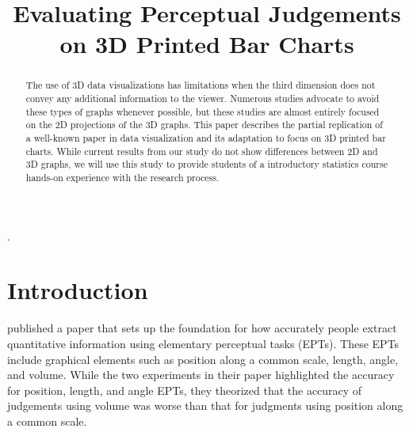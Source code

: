 \documentclass[letterpaper,inpress]{jdsart}
\begin{document}
\begin{frontmatter}

\title{Evaluating Perceptual Judgements on 3D Printed Bar Charts}

\author[1]{
      }
\author[1]{
      }

\address[1]{Department of Statistics, 
  , }

\begin{abstract}
The use of 3D data visualizations has limitations when the third dimension does not convey any additional information to the viewer. Numerous studies advocate to avoid these types of graphs whenever possible, but these studies are almost entirely focused on the 2D projections of the 3D graphs. This paper describes the partial replication of a well-known paper in data visualization and its adaptation to focus on 3D printed bar charts. While current results from our study do not show differences between 2D and 3D graphs, we will use this study to provide students of a introductory statistics course hands-on experience with the research process.
\end{abstract}

\begin{keywords}
.
\end{keywords}

\end{frontmatter}

\hypertarget{introduction}{%
\section{Introduction}\label{introduction}}

\citet{cleveland_graphical_1984} published a paper that sets up the foundation for how accurately people extract quantitative information using elementary perceptual tasks (EPTs). These EPTs include graphical elements such as position along a common scale, length, angle, and volume. While the two experiments in their paper highlighted the accuracy for position, length, and angle EPTs, they theorized that the accuracy of judgements using volume was worse than that for judgments using position along a common scale.
\end{document}
